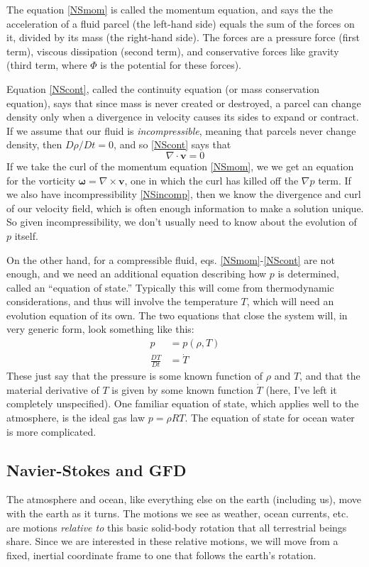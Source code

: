 \documentclass[11pt]{book}
\begin{document}
The equation \eqref{NSmom} is called the momentum equation, and says the the acceleration of a fluid parcel (the left-hand side) equals the sum of the forces on it, divided by its mass (the right-hand side).  The forces are a pressure force (first term), viscous dissipation (second term), and conservative forces like gravity (third term, where $\Phi$ is the potential for these forces).

Equation \eqref{NScont}, called the continuity equation (or mass conservation equation), says that since mass is never created or destroyed, a parcel can change density only when a divergence in velocity causes its sides to expand or contract.  If we assume that our fluid is \emph{incompressible}, meaning that parcels never change density, then $D\rho / Dt = 0$, and so \eqref{NScont} says that
\begin{equation}\nabla \cdot \mathbf{v} = 0\label{NSincomp}\end{equation}
If we take the curl of the momentum equation \eqref{NSmom}, we we get an equation for the vorticity $\mathbf{\omega} = \nabla \times \mathbf{v}$, one in which the curl has killed off the $\nabla p$ term.  If we also have incompressibility \eqref{NSincomp}, then we know the divergence and curl of our velocity field, which is often enough information to make a solution unique.  So given incompressibility, we don't usually need to know about the evolution of $p$ itself.

On the other hand, for a compressible fluid, eqs. \eqref{NSmom}-\eqref{NScont} are not enough, and we need an additional equation describing how $p$ is determined, called an ``equation of state.''  Typically this will come from thermodynamic considerations, and thus will involve the temperature $T$, which will need an evolution equation of its own.  The two equations that close the system will, in very generic form, look something like this:
\begin{align}p &= p(\rho, T) \\ \frac{DT}{Dt} &= \dot{T}\end{align}
These just say that the pressure is some known function of $\rho$ and $T$, and that the material derivative of $T$ is given by some known function $\dot{T}$ (here, I've left it completely unspecified).  One familiar equation of state, which applies well to the atmosphere, is the ideal gas law $p = \rho R T$.  The equation of state for ocean water is more complicated.
\subsection{Navier-Stokes and GFD}
The atmosphere and ocean, like everything else on the earth (including us), move with the earth as it turns.  The motions we see as weather, ocean currents, etc. are motions \emph{relative to} this basic solid-body rotation that all terrestrial beings share.  Since we are interested in these relative motions, we will move from a fixed, inertial coordinate frame to one that follows the earth's rotation.
\end{document}
